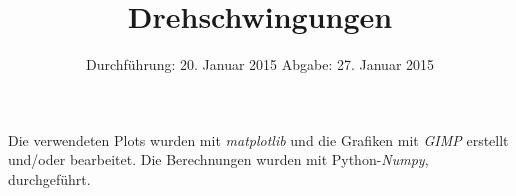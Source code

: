 
\usepackage{marvosym}
\subject{Anfängerpraktikum V102}
\title{Drehschwingungen
}
\date{
  Durchführung: 20. Januar 2015
  \hspace{1em}
  Abgabe: 27. Januar 2015
}


\maketitle
\thispagestyle{empty}
\newpage





\printbibliography
\noindent Die verwendeten Plots wurden mit \textit{matplotlib}\cite{matplotlib} und die Grafiken mit \textit{GIMP}\cite{gimp} erstellt und/oder bearbeitet.
Die Berechnungen wurden mit Python-\textit{Numpy}, \cite{numpy} durchgeführt.

